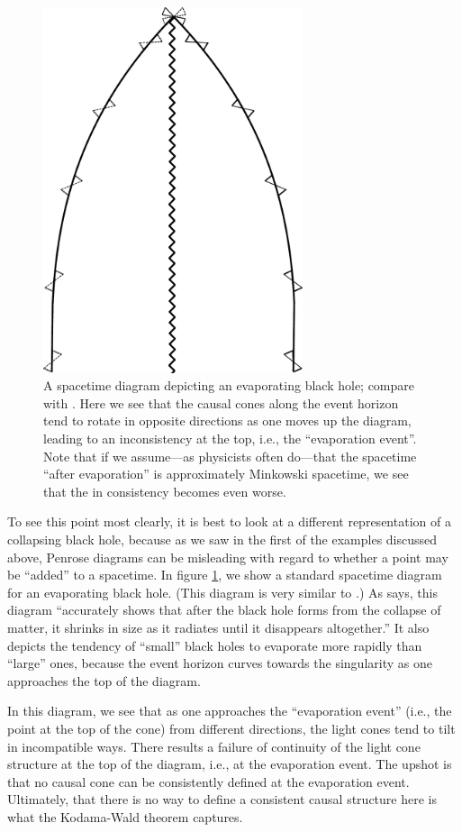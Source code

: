 \documentclass[authoryear,12pt,3p]{jowarticle}
\begin{document}
\begin{figure}[h]    \centering
   \includegraphics[width=3in]{BHE_ST_Diagram_new.pdf}
   \caption{\label{WaldFig} A spacetime diagram depicting an evaporating black hole; compare with \citet[Fig. 1]{Wald1984}.  Here we see that the causal cones along the event horizon tend to rotate in opposite directions as one moves up the diagram, leading to an inconsistency at the top, i.e., the ``evaporation event''.  Note that if we assume---as physicists often do---that the spacetime ``after evaporation'' is approximately Minkowski spacetime, we see that the in consistency becomes even worse.}
\end{figure}

To see this point most clearly, it is best to look at a different representation of a collapsing black hole, because as we saw in the first of the examples discussed above, Penrose diagrams can be misleading with regard to whether a point may be ``added'' to a spacetime.  In figure \ref{WaldFig}, we show a standard spacetime diagram for an evaporating black hole.  (This diagram is very similar to \citet[Fig. 1]{Wald1984}.)  As \citet[p. 162]{Wald1984} says, this diagram ``accurately shows that after the black hole forms from the collapse of matter, it shrinks in size as it radiates until it disappears altogether.''  It also depicts the tendency of ``small'' black holes to evaporate more rapidly than ``large'' ones, because the event horizon curves towards the singularity as one approaches the top of the diagram.

In this diagram, we see that as one approaches the ``evaporation event'' (i.e., the point at the top of the cone) from different directions, the light cones tend to tilt in incompatible ways.  There results a failure of continuity of the light cone structure at the top of the diagram, i.e., at the evaporation event.  The upshot is that no causal cone can be consistently defined at the evaporation event.  Ultimately, that there is no way to define a consistent causal structure here is what the Kodama-Wald theorem captures.
\end{document}
